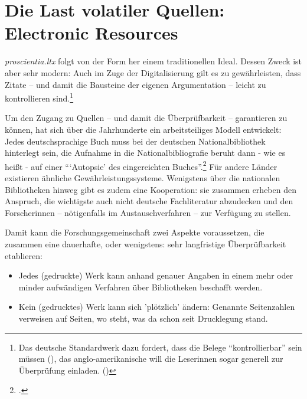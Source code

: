 
\appendix
\section{Die Last volatiler Quellen: Electronic Resources}

\emph{proscientia.ltx} folgt von der Form her einem traditionellen Ideal. Dessen Zweck ist aber sehr modern: Auch im Zuge der Digitalisierung gilt es zu gewährleisten, dass Zitate -- und damit die Bausteine der eigenen Argumentation -- leicht zu kontrollieren sind.\footnote{Das deutsche Standardwerk dazu fordert, dass die Belege \enquote{kontrollierbar} sein müssen (\cite[vgl.][160]{Theisen2013a}), das anglo-amerikanische will die Leserinnen sogar generell zur Überprüfung einladen. (\cite[vgl.][52]{ModLanAss2009a})}

Um den Zugang zu Quellen -- und damit die Überprüfbarkeit -- garantieren zu können, hat sich über die Jahrhunderte ein arbeitsteiliges Modell entwickelt: Jedes deutschsprachige Buch muss bei der deutschen Nationalbibliothek hinterlegt sein, die Aufnahme in die Nationalbibliografie beruht dann - wie es heißt - auf einer \enquote{\enquote{Autopsie} des eingereichten Buches}.\footcite[vgl.][68]{Theisen2013a} Für andere Länder existieren ähnliche Gewährleistungssysteme. Wenigstens über die nationalen Bibliotheken hinweg gibt es zudem eine Kooperation: sie zusammen erheben den Anspruch, die wichtigste auch nicht deutsche Fachliteratur abzudecken und den Forscherinnen -- nötigenfalls im Austauschverfahren -- zur Verfügung zu stellen.

Damit kann die Forschungsgemeinschaft zwei Aspekte voraussetzen, die zusammen eine dauerhafte, oder wenigstens: sehr langfristige Überprüfbarkeit etablieren:

\begin{itemize}
  \item Jedes (gedruckte) Werk kann anhand genauer Angaben in einem mehr oder minder aufwändigen Verfahren über Bibliotheken beschafft werden.
  \item  Kein (gedrucktes) Werk kann sich 'plötzlich' ändern: Genannte Seitenzahlen verweisen auf Seiten, wo steht, was da schon seit Drucklegung stand.
\end{itemize}

